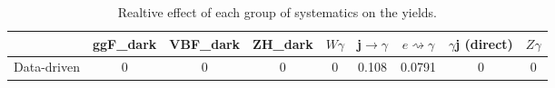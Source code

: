 \documentclass[10pt]{article}
\begin{document}
\begin{table}[htbp]
\begin{center}
\begin{tabular}{|c|c|c|c|c|c|c|c|c|}
\hline 
      & ggF_{dark}      & VBF_{dark}      & ZH_{dark}      & $W\gamma$      & j$\rightarrow\gamma$      & $e\rightsquigarrow\gamma$      & $\gamma$j (direct)      & $Z\gamma$ \\ 
\hline 
 Data-driven & 0 & 0 & 0 & 0 & 0.108 & 0.0791 & 0 & 0 \\ 
\hline 
\end{tabular} 
\caption{Realtive effect of each group of systematics on the yields.} 
\end{center} 
\end{table} 
\end{document}
